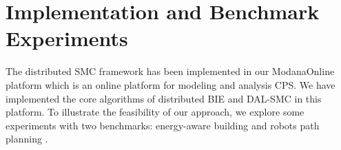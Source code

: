\section{Implementation and Benchmark Experiments}
The distributed SMC framework has been implemented in our ModanaOnline platform which is an online platform for modeling and analysis CPS. We have implemented the core algorithms of distributed BIE and DAL-SMC in this platform. To illustrate the feasibility of our approach, we explore some experiments with two benchmarks: energy-aware building \cite{david2012evaluation} and robots path planning \cite{Miura2000Modeling}.
%
%
%

